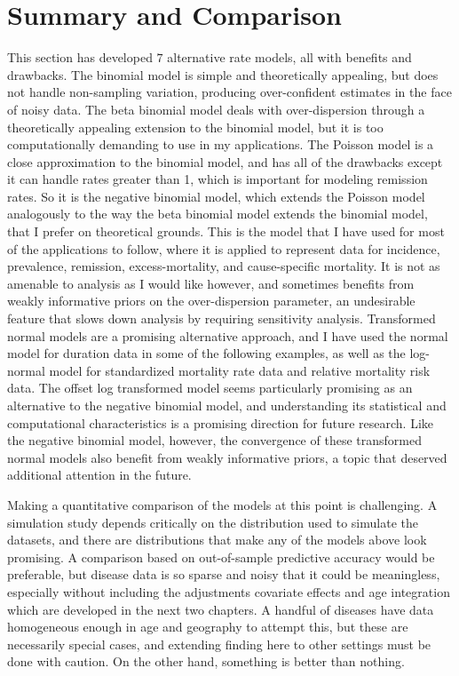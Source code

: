 \section{Summary and Comparison}
This section has developed $7$ alternative rate models, all with
benefits and drawbacks.  The binomial model is simple and
theoretically appealing, but does not handle non-sampling variation,
producing over-confident estimates in the face of noisy data.  The
beta binomial model deals with over-dispersion through a theoretically
appealing extension to the binomial model, but it is too
computationally demanding to use in my applications.  The Poisson
model is a close approximation to the binomial model, and has all of
the drawbacks except it can handle rates greater than 1, which is
important for modeling remission rates.  So it is the negative
binomial model, which extends the Poisson model analogously to the way
the beta binomial model extends the binomial model, that I prefer on
theoretical grounds.  This is the model that I have used for most of
the applications to follow, where it is applied to represent data for
incidence, prevalence, remission, excess-mortality, and cause-specific
mortality. It is not as amenable to analysis as I would like however,
and sometimes benefits from weakly informative priors on the
over-dispersion parameter, an undesirable feature that slows down
analysis by requiring sensitivity analysis.  Transformed normal models
are a promising alternative approach, and I have used the normal model
for duration data in some of the following examples, as well as the
log-normal model for standardized mortality rate data and relative
mortality risk data. The offset log transformed model seems
particularly promising as an alternative to the negative binomial
model, and understanding its statistical and computational
characteristics is a promising direction for future research.  Like
the negative binomial model, however, the convergence of these
transformed normal models also benefit from weakly informative priors,
a topic that deserved additional attention in the future.

Making a quantitative comparison of the models at this point is
challenging.  A simulation study depends critically on the
distribution used to simulate the datasets, and there are
distributions that make any of the models above look promising.  A
comparison based on out-of-sample predictive accuracy would be
preferable, but disease data is so sparse and noisy that it could be
meaningless, especially without including the adjustments covariate
effects and age integration which are developed in the next two
chapters.  A handful of diseases have data homogeneous enough in age
and geography to attempt this, but these are necessarily special
cases, and extending finding here to other settings must be done with
caution.  On the other hand, something is better than nothing.

